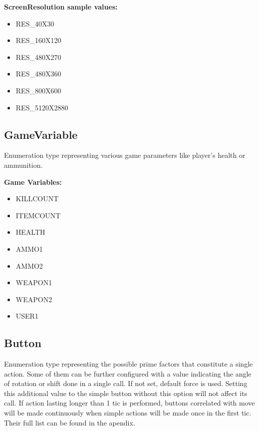 \vspace{20pt}
\textbf{ScreenResolution sample values:}
\begin{itemize}
\item RES\_40X30
\item RES\_160X120	
\item RES\_480X270	
\item RES\_480X360	
\item RES\_800X600
\item RES\_5120X2880
\end{itemize}

\subsection{GameVariable} \label{subsec:gamevar}
Enumeration type representing various game parameters like player's health or ammunition.


\vspace{20pt}
\textbf{Game Variables:}
\begin{itemize}
	\item KILLCOUNT\\
	\item ITEMCOUNT\\
	\item HEALTH\\
	\item AMMO1\\
	\item AMMO2\\
	\item WEAPON1
	\item WEAPON2\\
	\item USER1\\
\end{itemize}

\subsection{Button} \label{subsec:button}
Enumeration type representing the possible prime factors that constitute a single action. Some of them can be further configured with a value indicating the angle of rotation or shift done in a single call. If not set, default force is used. Setting this additional value to the simple button without this option will not affect its call. If action lasting longer than 1 tic is performed, buttons correlated with move will be made continuously when simple actions will be made once in the first tic. Their full list can be found in the apendix.

